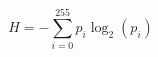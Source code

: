 \documentclass[preview,border=4pt]{standalone}
\begin{document}
\begin{equation}
H = -\sum_{i=0}^{255} p_i \log_2(p_i)
\end{equation}
\end{document}
